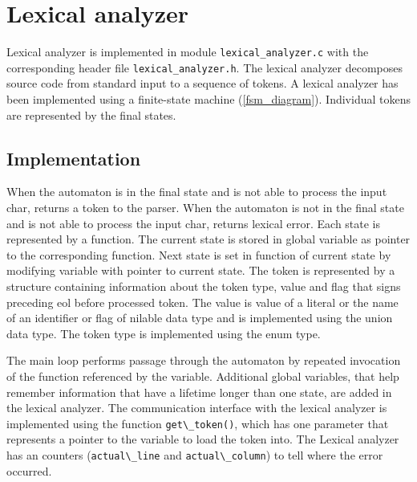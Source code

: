 \section{Lexical analyzer}
\label{Lexical analyzer}

Lexical analyzer is implemented in module \verb|lexical_analyzer.c| with the corresponding header file \verb|lexical_analyzer.h|.
The lexical analyzer decomposes source code from standard input to a sequence of tokens. A lexical analyzer has been implemented using a finite-state machine (\ref{fsm_diagram}). Individual tokens are represented by the final states.

\subsection{Implementation}
When the automaton is in the final state and is not able to process the input char, returns a token to the parser. When the automaton is not in the final state and is not able to process the input char, returns lexical error.
Each state is represented by a function. The current state is stored in global variable as pointer to the corresponding function. Next state is set in function of current state by modifying variable with pointer to current state. 
The token is represented by a structure containing information about the token type, value and flag that signs preceding eol before processed token. The value is value of a literal or the name of an identifier or flag of nilable data type and is implemented using the union data type. The token type is implemented using the enum type.

The main loop performs passage through the automaton by repeated invocation of the function referenced by the variable.
Additional global variables, that help remember information that have a lifetime longer than one state, are added in the lexical analyzer.
The communication interface with the lexical analyzer is implemented using the function \verb|get\_token()|, which has one parameter that represents a pointer to the variable to load the token into.
The Lexical analyzer has an counters (\verb|actual\_line| and \verb|actual\_column|) to tell where the error occurred.

\newpage

